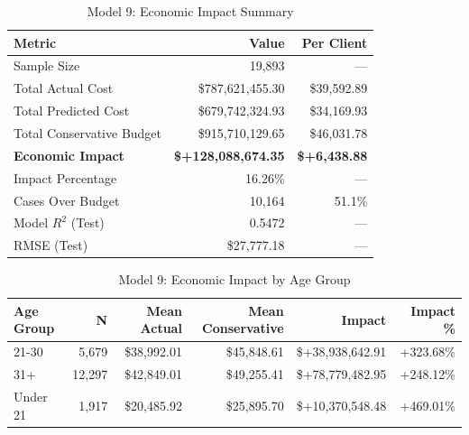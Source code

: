 \begin{table}[htbp]
\centering
\small
\caption{Model 9: Economic Impact Summary}
\label{tab:model9_impact_summary}
\begin{tabular}{lrr}
\toprule
\textbf{Metric} & \textbf{Value} & \textbf{Per Client} \\
\midrule
Sample Size & 19,893 & --- \\
\midrule
Total Actual Cost & \$787,621,455.30 & \$39,592.89 \\
Total Predicted Cost & \$679,742,324.93 & \$34,169.93 \\
Total Conservative Budget & \$915,710,129.65 & \$46,031.78 \\
\midrule
\textbf{Economic Impact} & \textbf{\$+128,088,674.35} & \textbf{\$+6,438.88} \\
Impact Percentage & 16.26\% & --- \\
\midrule
Cases Over Budget & 10,164 & 51.1\% \\
\midrule
Model $R^2$ (Test) & 0.5472 & --- \\
RMSE (Test) & \$27,777.18 & --- \\
\bottomrule
\end{tabular}
\end{table}

\begin{table}[htbp]
\centering
\small
\caption{Model 9: Economic Impact by Age Group}
\label{tab:model9_impact_age}
\begin{tabular}{lrrrrr}
\toprule
\textbf{Age Group} & \textbf{N} & \textbf{Mean Actual} & \textbf{Mean Conservative} & \textbf{Impact} & \textbf{Impact \%} \\
\midrule
21-30 & 5,679 & \$38,992.01 & \$45,848.61 & \$+38,938,642.91 & +323.68\% \\
31+ & 12,297 & \$42,849.01 & \$49,255.41 & \$+78,779,482.95 & +248.12\% \\
Under 21 & 1,917 & \$20,485.92 & \$25,895.70 & \$+10,370,548.48 & +469.01\% \\
\bottomrule
\end{tabular}
\end{table}

